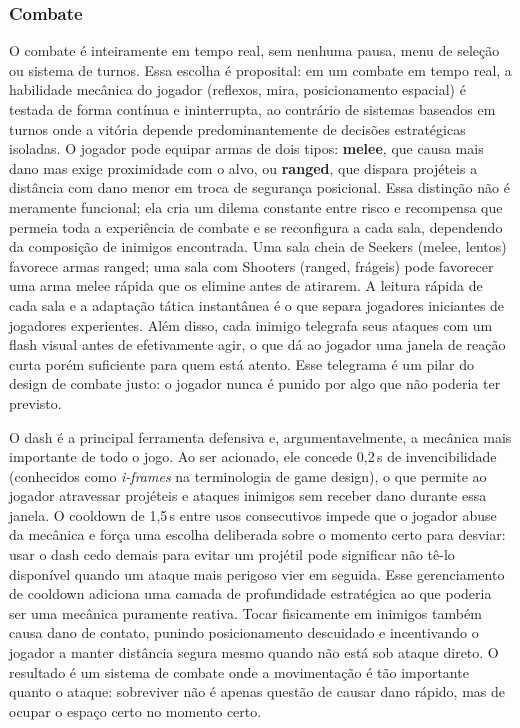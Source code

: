 \documentclass[12pt, a4paper]{article}
\begin{document}
\subsubsection{Combate}

O combate \'e inteiramente em tempo real, sem nenhuma pausa, menu de sele\c{c}\~ao ou sistema de turnos. Essa escolha \'e proposital: em um combate em tempo real, a habilidade mec\^anica do jogador (reflexos, mira, posicionamento espacial) \'e testada de forma cont\'inua e ininterrupta, ao contr\'ario de sistemas baseados em turnos onde a vit\'oria depende predominantemente de decis\~oes estrat\'egicas isoladas. O jogador pode equipar armas de dois tipos: \textbf{melee}, que causa mais dano mas exige proximidade com o alvo, ou \textbf{ranged}, que dispara proj\'eteis a dist\^ancia com dano menor em troca de seguran\c{c}a posicional. Essa distin\c{c}\~ao n\~ao \'e meramente funcional; ela cria um dilema constante entre risco e recompensa que permeia toda a experi\^encia de combate e se reconfigura a cada sala, dependendo da composi\c{c}\~ao de inimigos encontrada. Uma sala cheia de Seekers (melee, lentos) favorece armas ranged; uma sala com Shooters (ranged, fr\'ageis) pode favorecer uma arma melee r\'apida que os elimine antes de atirarem. A leitura r\'apida de cada sala e a adapta\c{c}\~ao t\'atica instant\^anea \'e o que separa jogadores iniciantes de jogadores experientes. Al\'em disso, cada inimigo telegrafa seus ataques com um flash visual antes de efetivamente agir, o que d\'a ao jogador uma janela de rea\c{c}\~ao curta por\'em suficiente para quem est\'a atento. Esse telegrama \'e um pilar do design de combate justo: o jogador nunca \'e punido por algo que n\~ao poderia ter previsto.

O dash \'e a principal ferramenta defensiva e, argumentavelmente, a mec\^anica mais importante de todo o jogo. Ao ser acionado, ele concede 0,2\,s de invencibilidade (conhecidos como \textit{i-frames} na terminologia de game design), o que permite ao jogador atravessar proj\'eteis e ataques inimigos sem receber dano durante essa janela. O cooldown de 1,5\,s entre usos consecutivos impede que o jogador abuse da mec\^anica e for\c{c}a uma escolha deliberada sobre o momento certo para desviar: usar o dash cedo demais para evitar um proj\'etil pode significar n\~ao t\^e-lo dispon\'ivel quando um ataque mais perigoso vier em seguida. Esse gerenciamento de cooldown adiciona uma camada de profundidade estrat\'egica ao que poderia ser uma mec\^anica puramente reativa. Tocar fisicamente em inimigos tamb\'em causa dano de contato, punindo posicionamento descuidado e incentivando o jogador a manter dist\^ancia segura mesmo quando n\~ao est\'a sob ataque direto. O resultado \'e um sistema de combate onde a movimenta\c{c}\~ao \'e t\~ao importante quanto o ataque: sobreviver n\~ao \'e apenas quest\~ao de causar dano r\'apido, mas de ocupar o espa\c{c}o certo no momento certo.
\end{document}
